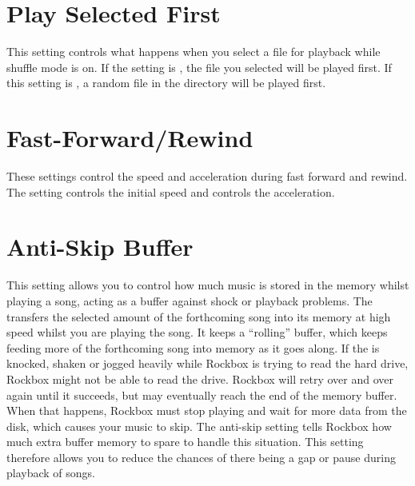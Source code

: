 \section{Play Selected First}
  This setting controls what happens when you
  select a file for playback while shuffle mode is on. If the
   setting is , the file you
  selected will be played first. If this setting is , a random
  file in the directory will be played first.

\section{Fast-Forward/Rewind}
  These settings control the speed and acceleration during fast forward and rewind.
  The setting  controls the initial speed and  controls the acceleration.

\section{Anti-Skip Buffer}
  This setting allows you to control how much music is
  stored in the \daps{} memory whilst playing a song, acting as a buffer
  against shock or playback problems. The \dap{} transfers the selected
  amount of the forthcoming song into its memory at high speed whilst you are
  playing the song. It keeps a ``rolling'' buffer, which keeps feeding more
  of the forthcoming song into memory as it goes along.
  If the \dap{} is knocked, shaken or jogged heavily while Rockbox is trying
  to read the hard drive, Rockbox might not be able to read the drive.
  Rockbox will retry over and over again until it succeeds, but may
  eventually reach the end of the memory buffer. When that happens, Rockbox
  must stop playing and wait for more data from the disk, which causes your
  music to skip. The anti-skip setting tells Rockbox how much extra buffer
  memory to spare to handle this situation. This setting therefore allows you
  to reduce the chances of there being a gap or pause during playback of
  songs.
    

    
